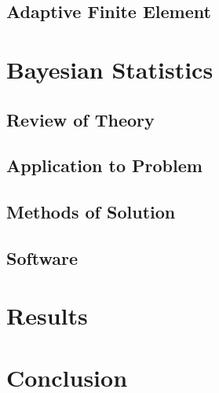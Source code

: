 \documentclass[10pt]{ubthesis}
\begin{document}
\section{Adaptive Finite Element}
\chapter{Bayesian Statistics}
\section{Review of Theory}
\section{Application to Problem}
\section{Methods of Solution}
\section{Software}
\chapter{Results}
\chapter{Conclusion}
\begin{ubbackmatter}


\end{ubbackmatter}
\end{document}
